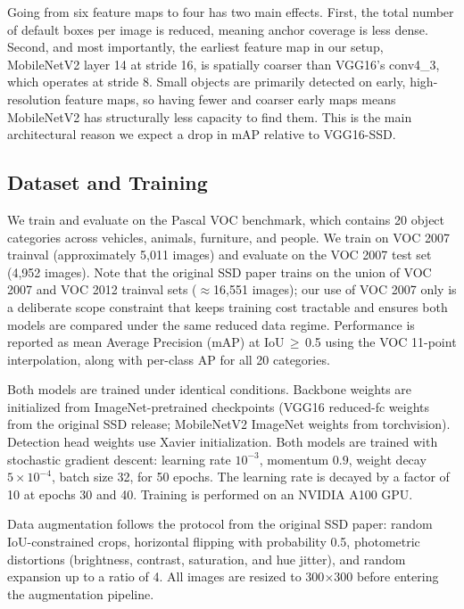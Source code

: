\documentclass{article}
\begin{document}
\qquad Going from six feature maps to four has two main effects. First, the total number of default boxes per image is reduced, meaning anchor coverage is less dense. Second, and most importantly, the earliest feature map in our setup, MobileNetV2 layer 14 at stride 16, is spatially coarser than VGG16's conv4\_3, which operates at stride 8. Small objects are primarily detected on early, high-resolution feature maps, so having fewer and coarser early maps means MobileNetV2 has structurally less capacity to find them. This is the main architectural reason we expect a drop in mAP relative to VGG16-SSD.

\subsection{Dataset and Training}

\qquad We train and evaluate on the Pascal VOC benchmark, which contains 20 object categories across vehicles, animals, furniture, and people. We train on VOC 2007 trainval (approximately 5,011 images) and evaluate on the VOC 2007 test set (4,952 images). Note that the original SSD paper trains on the union of VOC 2007 and VOC 2012 trainval sets ($\approx$16,551 images); our use of VOC 2007 only is a deliberate scope constraint that keeps training cost tractable and ensures both models are compared under the same reduced data regime. Performance is reported as mean Average Precision (mAP) at IoU\,$\geq$\,0.5 using the VOC 11-point interpolation, along with per-class AP for all 20 categories.

\qquad Both models are trained under identical conditions. Backbone weights are initialized from ImageNet-pretrained checkpoints (VGG16 reduced-fc weights from the original SSD release; MobileNetV2 ImageNet weights from torchvision). Detection head weights use Xavier initialization. Both models are trained with stochastic gradient descent: learning rate $10^{-3}$, momentum $0.9$, weight decay $5 \times 10^{-4}$, batch size 32, for 50 epochs. The learning rate is decayed by a factor of 10 at epochs 30 and 40. Training is performed on an NVIDIA A100 GPU.

\qquad Data augmentation follows the protocol from the original SSD paper: random IoU-constrained crops, horizontal flipping with probability 0.5, photometric distortions (brightness, contrast, saturation, and hue jitter), and random expansion up to a ratio of 4. All images are resized to 300$\times$300 before entering the augmentation pipeline.
\end{document}
